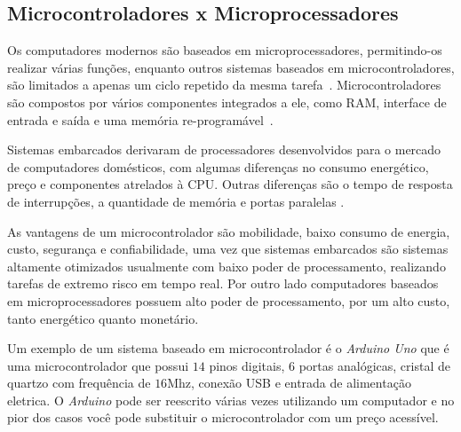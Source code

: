 \subsection{Microcontroladores x Microprocessadores}
\label{Sect:Micros}

Os computadores modernos são baseados em microprocessadores, permitindo-os realizar várias funções, enquanto outros sistemas baseados em microcontroladores, são limitados a apenas um ciclo repetido da mesma tarefa~\cite{heath:2002}. Microcontroladores são compostos por vários componentes integrados a ele, como RAM, interface de entrada e saída e uma memória re-programável~\cite{white:2011}.


Sistemas embarcados derivaram de processadores desenvolvidos para o mercado de computadores domésticos, com algumas diferenças no consumo energético, preço e componentes atrelados à CPU. Outras diferenças são o tempo de resposta de interrupções, a quantidade de memória e portas paralelas \cite{schlett:1998}.


As vantagens de um microcontrolador são mobilidade, baixo consumo de energia, custo, segurança e confiabilidade, uma vez que sistemas embarcados são sistemas 
altamente otimizados usualmente com baixo poder de processamento, realizando tarefas de extremo risco em tempo real. Por outro lado computadores baseados em microprocessadores possuem alto poder de processamento, por um alto custo, tanto energético quanto monetário. %

Um exemplo de um sistema baseado em microcontrolador é o \textit{Arduino Uno} \cite{Arduino2018ArduinoRev3} que é uma microcontrolador que possui $14$ pinos digitais, $6$ portas analógicas, cristal de quartzo com frequência de $16$Mhz, conexão USB e entrada de alimentação eletrica. O \textit{Arduino} pode ser reescrito várias vezes utilizando um computador e no pior dos casos você pode substituir o microcontrolador com um preço acessível.


